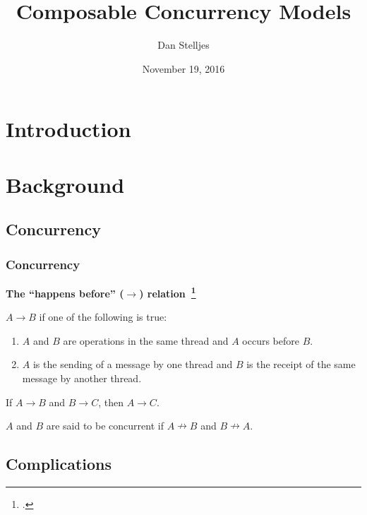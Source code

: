 \documentclass[aspectratio=1610]{beamer}
\title{Composable Concurrency Models}
\date{November 19, 2016}
\author{Dan Stelljes}
\begin{document}
  \maketitle

  \section*{Introduction}

  \begin{frame}
    \centering
    \resizebox{0.8\linewidth}{!}{}
  \end{frame}

  \begin{frame}
    \begin{multicols}{2}
      \tableofcontents
    \end{multicols}
  \end{frame}

  \section{Background}

  \subsection{Concurrency}

  \begin{frame}
    \frametitle{Concurrency}

    \textbf{The ``happens before'' ($\rightarrow$) relation~\footcite{Lamport1977}}

    $A \rightarrow B$ if one of the following is true:

    \begin{enumerate}
      \item $A$ and $B$ are operations in the same thread and $A$ occurs before $B$.
      \item $A$ is the sending of a message by one thread and $B$ is the receipt of the same message by another thread.
    \end{enumerate}

    If $A \rightarrow B$ and $B \rightarrow C$, then $A \rightarrow C$.

    $A$ and $B$ are said to be concurrent if $A \nrightarrow B$ and $B \nrightarrow A$.
  \end{frame}

  \subsection{Complications}
\end{document}
